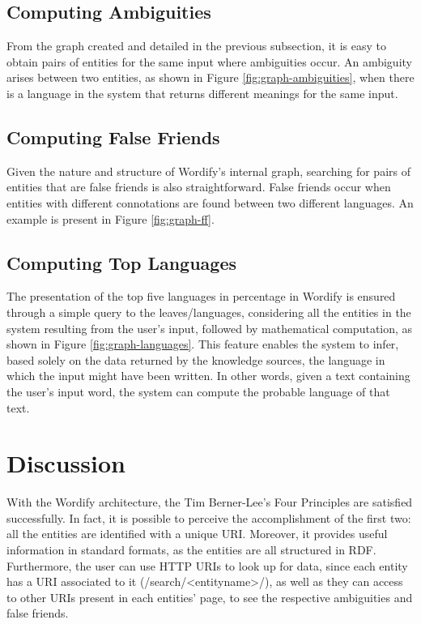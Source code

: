 \documentclass[twocolumn,twoside,11pt,a4paper]{article}
\begin{document}
\subsection{Computing Ambiguities}

From the graph created and detailed in the previous subsection, it is easy to obtain pairs of entities for the same input where ambiguities occur. An ambiguity arises between two entities, as shown in Figure \ref{fig:graph-ambiguities}, when there is a language in the system that returns different meanings for the same input.

\subsection{Computing False Friends}

Given the nature and structure of Wordify's internal graph, searching for pairs of entities that are false friends is also straightforward. False friends occur when entities with different connotations are found between two different languages. An example is present in Figure \ref{fig:graph-ff}.

\subsection{Computing Top Languages}

The presentation of the top five languages in percentage in Wordify is ensured through a simple query to the leaves/languages, considering all the entities in the system resulting from the user's input, followed by mathematical computation, as shown in Figure \ref{fig:graph-languages}. This feature enables the system to infer, based solely on the data returned by the knowledge sources, the language in which the input might have been written. In other words, given a text containing the user's input word, the system can compute the probable language of that text.


\section{Discussion}\label{sec:discussion}

With the Wordify architecture, the Tim Berner-Lee's Four Principles \cite{kn:tbl} are satisfied successfully. In fact, it is possible to perceive the accomplishment of the first two: all the entities are identified with a unique URI. Moreover, it provides useful information in standard formats, as the entities are all structured in RDF. Furthermore, the user can use HTTP URIs to look up for data, since each entity has a URI associated to it (/search/<entity\-name>/), as well as they can access to other URIs present in each entities' page, to see the respective ambiguities and false friends.
\end{document}
